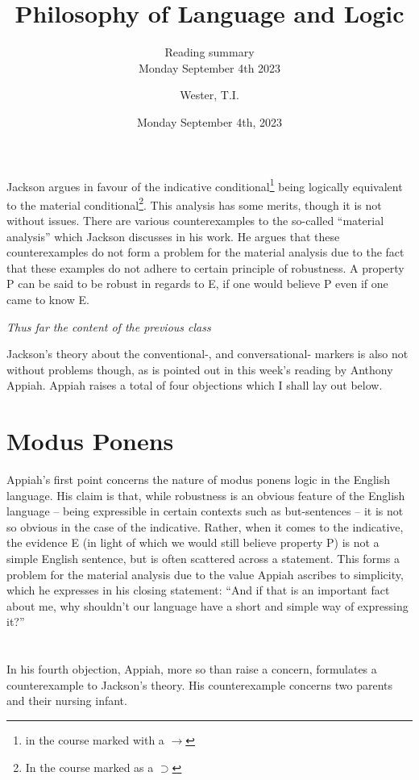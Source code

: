 \documentclass[12pt]{article}
\title{Philosophy of Language and Logic}
\subtitle{Reading summary\\Monday September 4th 2023}
\date{Monday September 4th, 2023}
\author{Wester, T.I.}
\begin{document}
\maketitle

Jackson argues in favour of the indicative conditional\footnote{in the course
marked with a $\rightarrow$} being logically equivalent to the material
conditional\footnote{In the course marked as a $\supset$}. This analysis has
some merits, though it is not without issues. There are various counterexamples
to the so-called ``material analysis'' which Jackson discusses in his work. He
argues that these counterexamples do not form a problem for the material
analysis due to the fact that these examples do not adhere to certain
principle of robustness. A property P can be said to be robust in regards to E,
if one would believe P even if one came to know E.

\textit{Thus far the content of the previous class}

Jackson's theory about the conventional-, and conversational- markers is also
not without problems though, as is pointed out in this week's reading by Anthony
Appiah. Appiah raises a total of four objections which I shall lay out below.

\section{Modus Ponens}

Appiah's first point concerns the nature of modus ponens logic in the English
language. His claim is that, while robustness is an obvious feature of the
English language -- being expressible in certain contexts such as but-sentences
-- it is not so obvious in the case of the indicative. Rather, when it comes to
the indicative, the evidence E (in light of which we would still believe
property P) is not a simple English sentence, but is often scattered across a
statement. This forms a problem for the material analysis due to the value
Appiah ascribes to simplicity, which he expresses in his closing statement:
``And if that is an important fact about me, why shouldn't our language have a
short and simple way of expressing it?''

\section{}

\section{}

\section{}

In his fourth objection, Appiah, more so than raise a concern, formulates a
counterexample to Jackson's theory. His counterexample concerns two parents and
their nursing infant. 
\end{document}
